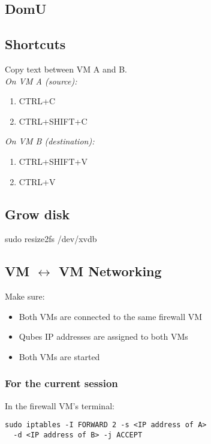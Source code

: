 \documentclass[10pt,a4paper,landscape,twocolumn]{scrartcl}
\begin{document}
\subsection*{DomU}

\subsection*{Shortcuts}
Copy text between VM A and B.\\
\textit{On VM A (source):}
\begin{enumerate}
	\item CTRL+C
	\item CTRL+SHIFT+C
\end{enumerate}
\textit{On VM B (destination):}
\begin{enumerate}
	\item CTRL+SHIFT+V
	\item CTRL+V
\end{enumerate}

\subsection*{Grow disk}
sudo resize2fs /dev/xvdb

\subsection*{VM $\leftrightarrow$ VM Networking}
Make sure:
\begin{itemize}
	\item Both VMs are connected to the same firewall VM
	\item Qubes IP addresses are assigned to both VMs
	\item Both VMs are started
\end{itemize}
\subsubsection*{For the current session}
In the firewall VM's terminal:
\begin{verbatim}
sudo iptables -I FORWARD 2 -s <IP address of A> 
  -d <IP address of B> -j ACCEPT
\end{verbatim}
\end{document}
